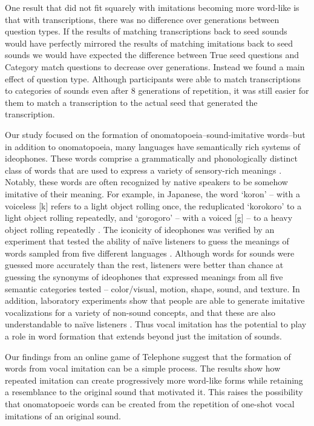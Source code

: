 \documentclass[10pt,letterpaper]{article}
\begin{document}
One result that did not fit squarely with imitations becoming more
word-like is that with transcriptions, there was no difference over
generations between question types. If the results of matching
transcriptions back to seed sounds would have perfectly mirrored the
results of matching imitations back to seed sounds we would have
expected the difference between True seed questions and Category match
questions to decrease over generations. Instead we found a main effect
of question type. Although participants were able to match
transcriptions to categories of sounds even after 8 generations of
repetition, it was still easier for them to match a transcription to the
actual seed that generated the transcription.

Our study focused on the formation of onomatopoeia--sound-imitative
words--but in addition to onomatopoeia, many languages have semantically
rich systems of ideophones. These words comprise a grammatically and
phonologically distinct class of words that are used to express a
variety of sensory-rich meanings
\citep{Dingemanse:2012fc, Voeltz:2001vv}. Notably, these words are often
recognized by native speakers to be somehow imitative of their meaning.
For example, in Japanese, the word `koron' -- with a voiceless {[}k{]}
refers to a light object rolling once, the reduplicated `korokoro' to a
light object rolling repeatedly, and `gorogoro' -- with a voiced {[}g{]}
-- to a heavy object rolling repeatedly \citep{Imai:2014dea}. The
iconicity of ideophones was verified by an experiment that tested the
ability of naïve listeners to guess the meanings of words sampled from
five different languages \citep{Dingemanse:2016vd}. Although words for
sounds were guessed more accurately than the rest, listeners were better
than chance at guessing the synonyms of ideophones that expressed
meanings from all five semantic categories tested -- color/visual,
motion, shape, sound, and texture. In addition, laboratory experiments
show that people are able to generate imitative vocalizations for a
variety of non-sound concepts, and that these are also understandable to
naïve listeners \citep{Perlman:2015ip}. Thus vocal imitation has the
potential to play a role in word formation that extends beyond just the
imitation of sounds.

Our findings from an online game of Telephone suggest that the formation
of words from vocal imitation can be a simple process. The results show
how repeated imitation can create progressively more word-like forms
while retaining a resemblance to the original sound that motivated it.
This raises the possibility that onomatopoeic words can be created from
the repetition of one-shot vocal imitations of an original sound.



\end{document}
